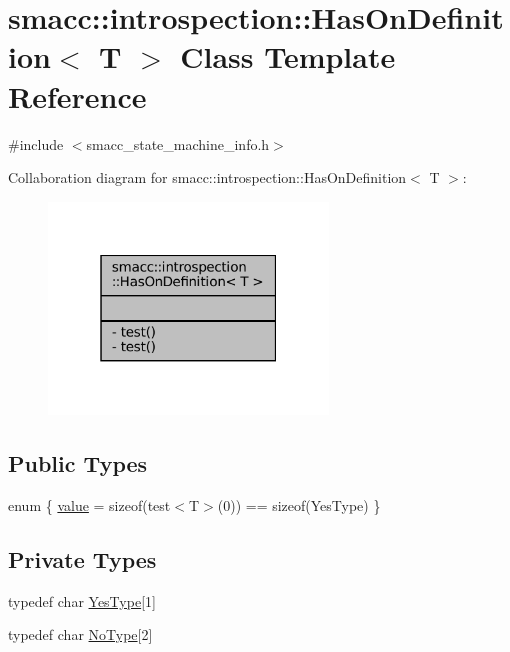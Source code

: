 \hypertarget{classsmacc_1_1introspection_1_1HasOnDefinition}{}\section{smacc\+:\+:introspection\+:\+:Has\+On\+Definition$<$ T $>$ Class Template Reference}
\label{classsmacc_1_1introspection_1_1HasOnDefinition}


{\ttfamily \#include $<$smacc\+\_\+state\+\_\+machine\+\_\+info.\+h$>$}



Collaboration diagram for smacc\+:\+:introspection\+:\+:Has\+On\+Definition$<$ T $>$\+:
\nopagebreak
\begin{figure}[H]
\begin{center}
\leavevmode
\includegraphics[width=211pt]{classsmacc_1_1introspection_1_1HasOnDefinition__coll__graph}
\end{center}
\end{figure}
\subsection*{Public Types}
\begin{DoxyCompactItemize}
\item 
enum \{ \hyperlink{classsmacc_1_1introspection_1_1HasOnDefinition_ab40a368fd2564562bf0107984f5f197da2c667ca4893ef31062bc9864e4d06ab2}{value} = sizeof(test$<$T$>$(0)) == sizeof(Yes\+Type)
 \}
\end{DoxyCompactItemize}
\subsection*{Private Types}
\begin{DoxyCompactItemize}
\item 
typedef char \hyperlink{classsmacc_1_1introspection_1_1HasOnDefinition_ad18cda8f47c5a0e9660b7c7ca54d98c7}{Yes\+Type}\mbox{[}1\mbox{]}
\item 
typedef char \hyperlink{classsmacc_1_1introspection_1_1HasOnDefinition_ab6416d52a925d6a0ce9204897191692e}{No\+Type}\mbox{[}2\mbox{]}
\end{DoxyCompactItemize}

